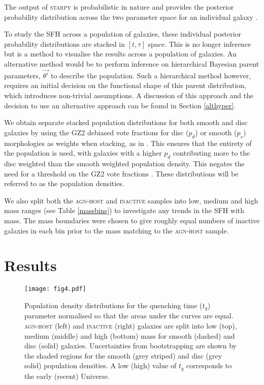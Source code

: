 \documentclass[useAMS,usenatbib]{mn2e}
\def\changed    {\color{nc} }
\def\changedbds    {\color{ncc} }
\def\secondchange    {\color{srv} }
\def\newref    {\color{new} }
\def\starpy ~{\textsc{starpy}}
\begin{document}
The output of \starpy  ~ is probabilistic in nature and provides the posterior probability distribution across the two parameter space for an individual galaxy {\newref \citep[the degeneracies for which can be seen in Figure 4 of]{Sme2015} }. {\changed To study the SFH across a population of galaxies, these individual posterior probability distributions are {\secondchange stacked in $[t, \tau]$ space. This is no longer inference but is a method to visualise the results across a population of galaxies. An alternative method would be to perform inference on hierarchical Bayesian parent parameters, $\vec{\theta'}$ to describe the population. Such a hierarchical method however, requires an initial decision on the functional shape of this parent distribution, which introduces non-trivial assumptions. A discussion of this approach and the decision to use an alternative approach can be found in Section \ref{althyper}.}

We obtain separate stacked population distributions for both smooth and disc galaxies by using the GZ2 debiased vote fractions for disc ($p_d$) or smooth ($p_s$) morphologies as weights when stacking, as in \citet{Sme2015}. This ensures that the entirety of the population is used, with galaxies with a higher $p_d$ contributing more to the disc weighted than the smooth weighted population density. This negates the need for a threshold on the GZ2 vote fractions \citep[e.g., $p_d > 0.8$ as used in][]{Sch2014}. {\secondchange These distributions will be referred to as the population densities.}}


We also split both the \textsc{agn-host} and \textsc{inactive} samples into low, medium and high mass ranges (see Table \ref{massbins}) to investigate any trends in the SFH with mass. {\changed The mass boundaries were chosen to give roughly equal numbers of inactive galaxies in each bin prior to the mass matching to the \textsc{agn-host} sample.} 


\section{Results}

\begin{figure*}
\texttt{[image: fig4.pdf]}
\caption{{\secondchange Population density} distributions for the quenching time ($t_q$) parameter {\changedbds normalised so that the areas under the curves are equal}. \textsc{agn-host} (left) and \textsc{inactive} (right) galaxies are split into low (top), medium (middle) and high (bottom) mass for smooth (dashed) and disc (solid) galaxies. {\newref Uncertainties from bootstrapping are shown by the shaded regions for the smooth (grey striped) and disc (grey solid) population densities.} A low (high) value of $t_q$ corresponds to the early (recent) Universe.}
\label{time}
\end{figure*}
\end{document}
